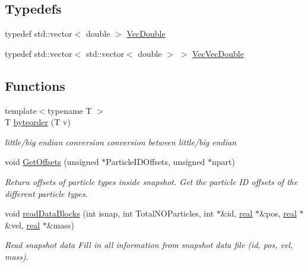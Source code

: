 \subsection*{Typedefs}
\begin{DoxyCompactItemize}
\item 
typedef std::vector$<$ double $>$ \hyperlink{AnalyzeSnap_8cpp_a00624963fadb9859c2785372d78dbf7d}{VecDouble}
\item 
typedef std::vector$<$ std::vector$<$ double $>$ $>$ \hyperlink{AnalyzeSnap_8cpp_a19eaba2936536c4981d32fb3556862a5}{VecVecDouble}
\end{DoxyCompactItemize}
\subsection*{Functions}
\begin{DoxyCompactItemize}
\item 
{\footnotesize template$<$typename T $>$ }\\T \hyperlink{AnalyzeSnap_8cpp_a5f4ec08ca17aee191961be83ac9d1e48}{byteorder} (T v)
\begin{DoxyCompactList}\small\item\em little/big endian conversion conversion between little/big endian \item\end{DoxyCompactList}\item 
void \hyperlink{AnalyzeSnap_8cpp_afae3a184f26b7f4398f94e4927188291}{GetOffsets} (unsigned $\ast$ParticleIDOffsets, unsigned $\ast$npart)
\begin{DoxyCompactList}\small\item\em Return offsets of particle types inside snapshot. Get the particle ID offsets of the different particle types. \item\end{DoxyCompactList}\item 
void \hyperlink{AnalyzeSnap_8cpp_a5e23ce523297aeb1c2f118568cefb975}{readDataBlocks} (int isnap, int TotalNOParticles, int $\ast$\&id, \hyperlink{Global_8h_a031f8951175b43076c2084a6c2173410}{real} $\ast$\&pos, \hyperlink{Global_8h_a031f8951175b43076c2084a6c2173410}{real} $\ast$\&vel, \hyperlink{Global_8h_a031f8951175b43076c2084a6c2173410}{real} $\ast$\&mass)
\begin{DoxyCompactList}\small\item\em Read snapshot data Fill in all information from snapshot data file (id, pos, vel, mass). \item\end{DoxyCompactList}\item 

\end{DoxyCompactItemize}
